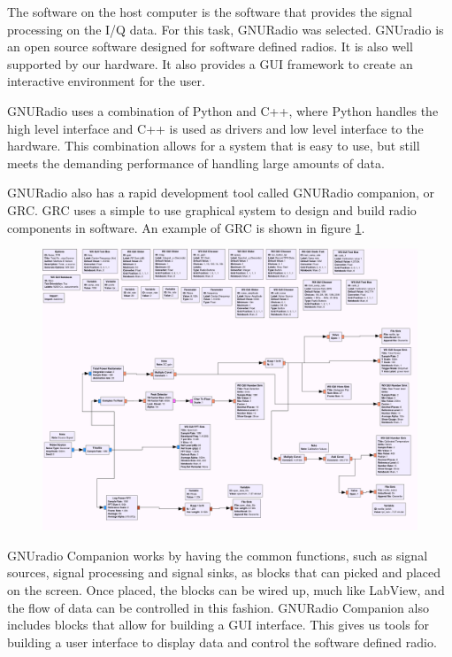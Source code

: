 The software on the host computer is the software that provides the signal processing on the I/Q data.  For this task, GNURadio was selected.   GNUradio is an open source software designed for software defined radios.  It is also well supported by our hardware.  It also provides a GUI framework to create an interactive environment for the user.   

GNURadio uses a combination of Python and C++, where Python handles the high level interface and C++ is used as drivers and low level interface to the hardware.  This combination allows for a system that is easy to use, but still meets the demanding performance of handling large amounts of data. 

GNURadio also has a rapid development tool called GNURadio companion, or GRC.  GRC uses a simple to use graphical system to design and build radio components in software. An example of GRC is shown in figure \ref{N200_GRC}.

{\begin{figure}[h!tb] \centering
\includegraphics[width=\textwidth]{Images/noisesrc_radiometer.png}
\label{N200_GRC}
\end{figure}
}

GNUradio Companion works by having the common functions, such as signal sources, signal processing and signal sinks, as blocks that can picked and placed on the screen.  Once placed, the blocks can be wired up, much like LabView, and the flow of data can be controlled in this fashion.  GNURadio Companion also includes blocks that allow for building a GUI interface.  This gives us tools for building a user interface to display data and control the software defined radio.


